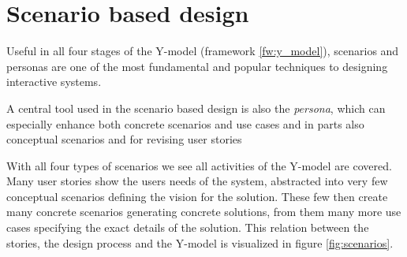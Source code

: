 \section{Scenario based design} \label{sec:scenario_based_design}
Useful in all four stages of the Y-model (framework \ref{fw:y_model}), scenarios and personas are one of the most fundamental and popular techniques to designing interactive systems. \cite[p. 62]{benyon_14}






A central tool used in the scenario based design is also the \emph{persona}, which can especially enhance both concrete scenarios and use cases and in parts also conceptual scenarios and for revising user stories



With all four types of scenarios we see all activities of the Y-model are covered. Many user stories show the users needs of the system, abstracted into very few conceptual scenarios defining the vision for the solution. These few then create many concrete scenarios generating concrete solutions, from them many more use cases specifying the exact details of the solution. This relation between the stories, the design process and the Y-model is visualized in figure \ref{fig:scenarios}.




